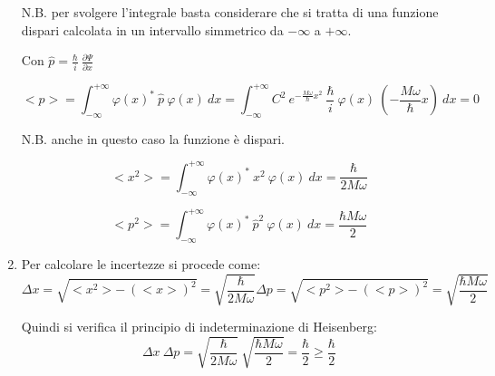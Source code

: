 \documentclass[12pt,twoside,a4]{article}
\begin{document}
\begin{solution}
\begin{enumerate}[label=(\textit{\roman*})]
N.B. per svolgere l'integrale basta considerare che si tratta di una funzione dispari calcolata in un intervallo simmetrico da $-\infty$ a $+\infty$.


Con $\hat{p} = \frac{\hbar}{i} \ \frac{\partial \Psi}{\partial x}$ 

\begin{equation*}
    < p > = \int_{-\infty}^{+\infty} {\varphi(x)^\ast \ \hat{p} \ \varphi(x)} \ dx = \int_{-\infty}^{+\infty} {C^2 \ e^{-\frac{M \omega}{\hbar} x^2} \ \frac{\hbar}{i} \ \varphi(x) \ \left(-\frac{M \omega}{\hbar} x\right)} \ dx = 0       
\end{equation*}

N.B. anche in questo caso la funzione è dispari. 

\begin{equation*}
    < x^2 > = \int_{-\infty}^{+\infty} {\varphi(x)^\ast \ x^2 \ \varphi(x)} \ dx = \frac{\hbar}{2 M \omega} 
\end{equation*}

\begin{equation*}
    < p^2 > = \int_{-\infty}^{+\infty} {\varphi(x)^\ast \ \hat{p}^2 \ \varphi(x)} \ dx = \frac{\hbar M \omega}{2}  
\end{equation*}

\item Per calcolare le incertezze si procede come: 
\begin{equation*}
    \Delta x = \sqrt{< x^2 > -  \ (< x >)^2} = \sqrt{\frac{\hbar}{2 M \omega}}   \Delta p = \sqrt{< p^2 > - \ (< p >)^2 } = \sqrt{\frac{\hbar M \omega}{2}} 
\end{equation*}

Quindi si verifica il principio di indeterminazione di Heisenberg:
\begin{equation*}
    \Delta x \ \Delta p = \sqrt{\frac{\hbar}{2 M \omega}} \ \sqrt{\frac{\hbar M \omega}{2}} = \frac{\hbar}{2} \geq \frac{\hbar }{2} 
\end{equation*}

\end{enumerate}
\end{solution}
\end{document}
